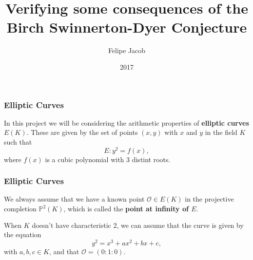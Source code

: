 \documentclass{beamer}
\title[BSD]{Verifying some consequences of the Birch Swinnerton-Dyer Conjecture}
\author{Felipe Jacob}
\institute[UCL]{University College London}
\date{2017}
\begin{document}
\newcommand{\defin}{\textbf}
\newcommand{\CC}{{\mathbb C}}
\newcommand{\cov}{{\operatorname{cov}}}
\newcommand{\eE}{{\mathcal E}}
\newcommand{\NN}{{\mathbb N}}
\newcommand{\PP}{{\mathbb P}}
\newcommand{\ZZ}{{\mathbb Z}}
\renewcommand{\SS}{{\mathbb S}}
\newcommand{\DD}{{\mathbb D}}
\newcommand{\RR}{{\mathbb R}}
\newcommand{\QQ}{{\mathbb Q}}
\newcommand{\rR}{{\mathcal R}}
\newcommand{\OO}{{\mathcal O}}
\newcommand{\p}{\partial}
\newcommand{\mM}{{\mathcal M}}
\newcommand{\pP}{{\mathcal P}}
\newcommand{\iI}{{\mathcal I}}
\newcommand{\jJ}{{\mathcal J}}
\newcommand{\uU}{{\mathcal U}}
\newcommand{\sS}{{\mathfrak S}}
\newcommand{\1}{{\mathds 1}}
\newcommand{\Crit}{\operatorname{Crit}}
\newcommand{\GKK}{{G_{\bar{K} : K}}}
\newcommand{\st}{{\text{s.t.}}}
\newcommand{\ra}{\rightarrow}
\newcommand{\Sel}{\text{\normalfont Sel}}
\newcommand{\Sha}{\text{\normalfont Sha}}
\newcommand{\TS}{\text{\normalfont TS}}
\newcommand{\Eb}{\bar{E}}
\newcommand{\EQ}{E(\QQ)}
\newcommand{\cmark}{\textrm{\ding{51}}}
\newcommand{\xmark}{\textrm{\ding{55}}}
\newcommand{\EFp}{{\tilde{E}(\FF_p)}}
\newcommand{\EFt}{{\tilde{E}(\FF_2)}}
\newcommand{\EQp}{{E(\QQ_p)}}
\newcommand{\FF}{\mathbb{F}}
\newcommand{\HH}{\mathbb{H}}
\newcommand{\Tors}{{\text{\normalfont Tors}}}
\newcommand{\parder}[2]{\frac{\partial #1}{\partial #2}}
\newcommand{\Zpx}{\mathbb{Z}_p^\times}
\newcommand{\legendre}[2]{\left(\frac{#1}{#2}\right)}
\newcommand{\quadring}[1]{\ZZ[\sqrt{#1}]}
\newcommand{\Ip}{\mathfrak{p}}
\newcommand{\Aa}{\mathbb{A}}
\newcommand{\LL}{\mathcal{L}}
\newcommand{\Shim}{\textnormal{Shim}}

\frame{\titlepage}
 
\begin{frame}
\frametitle{Elliptic Curves}
In this project we will be considering the arithmetic properties of
\textbf{elliptic curves} $E(K)$. These are given by the set of points $(x, y)$
with $x$ and $y$ in
the field $K$ such that
\[E: y^2 = f(x),\]
where $f(x)$ is a cubic polynomial with 3 distint roots.
\end{frame}

\begin{frame}
\frametitle{Elliptic Curves}
  We always assume that we have a known point $\OO \in E(K)$ in the projective
  completion $\PP^2(K)$, which is called the \textbf{point at infinity of $E$}. \pause

  When $K$ doesn't have characteristic 2, we can assume that the curve is given
  by the equation
  \[y^2 = x^3 + ax^2 + bx + c,\]
  with $a, b, c \in K$, and that $\OO = (0:1:0).$
\end{frame}
\end{document}
